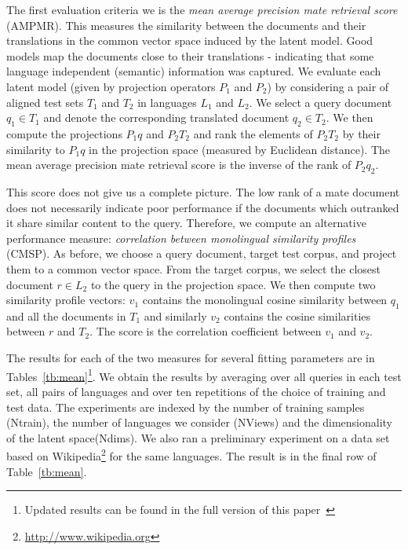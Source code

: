 \documentclass{article} %
\begin{document}
The first evaluation criteria we is the \emph{mean average
  precision mate retrieval score} (AMPMR). This measures the
similarity between the documents and their translations in the
common vector space induced by the latent model. Good models map
the documents close to their translations - indicating that some
language independent (semantic) information was captured.  We
evaluate each latent model (given by projection operators $P_1$
and $P_2$) by considering a pair of aligned test sets $T_1$ and
$T_2$ in languages $L_1$ and $L_2$. We select a query document
$q_1 \in T_1$ and denote the corresponding translated document
$q_2\in T_2$.  We then compute the projections $P_1 q$ and $P_2
T_2$ and rank the elements of $P_2 T_2$ by their similarity to
$P_1 q$ in the projection space (measured by Euclidean
distance). The mean average precision mate retrieval score is the
inverse of the rank of $P_2 q_2$.

This score does not give us a complete picture. The low rank of a
mate document does not necessarily indicate poor performance if
the documents which outranked it share similar content to the
query. Therefore, we compute an alternative performance measure:
\emph{correlation between monolingual similarity profiles}
(CMSP). As before, we choose a query document, target test
corpus, and project them to a common vector space. From the
target corpus, we select the closest document $r \in L_2$ to the
query in the projection space.  We then compute two similarity
profile vectors: $v_1$ contains the monolingual cosine similarity
between $q_1$ and all the documents in $T_1$ and similarly $v_2$
contains the cosine similarities between $r$ and $T_2$. The score
 is the correlation coefficient between $v_1$ and $v_2$.

The results for each of the two measures for several fitting
parameters are in Tables~\ref{tb:mean}\footnote{Updated results
  can be found in the full version of this
  paper~\cite{full_version}}. We obtain the results by averaging
over all queries in each test set, all pairs of languages and
over ten repetitions of the choice of training and test data. The
experiments are indexed by the number of training samples
(Ntrain), the number of languages we consider (NViews) and the
dimensionality of the latent space(Ndims). We also ran a
preliminary experiment on a data set based on
Wikipedia\footnote{\url{http://www.wikipedia.org}} for the same
languages.  The result is in the final row of
Table~\ref{tb:mean}.
\end{document}
